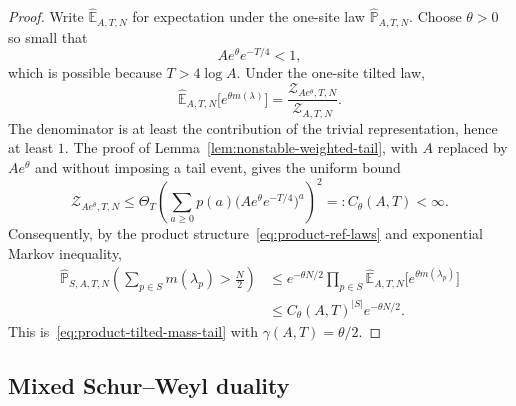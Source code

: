 \documentclass[11pt,a4paper,reqno]{amsart}
\theoremstyle{definition}
\theoremstyle{remark}
\newcommand\E{{\mathbb E}}
\newcommand\Pbb{{\mathbb{P}}}
\begin{document}
\begin{proof}
Write $\widehat\E_{A,T,N}$ for expectation under the one-site law $\widehat\Pbb_{A,T,N}$. Choose $\theta>0$ so small that
\[
Ae^{\theta}e^{-T/4}<1,
\]
which is possible because $T>4\log A$. Under the one-site tilted law,
\[
\widehat\E_{A,T,N}\bigl[e^{\theta m(\lambda)}\bigr]
=\frac{\mathcal Z_{Ae^{\theta},T,N}}{\mathcal Z_{A,T,N}}.
\]
The denominator is at least the contribution of the trivial representation, hence at least $1$. The proof of Lemma~\ref{lem:nonstable-weighted-tail}, with $A$ replaced by $Ae^{\theta}$ and without imposing a tail event, gives the uniform bound
\[
\mathcal Z_{Ae^{\theta},T,N}
\le \Theta_T\left(\sum_{a\ge0}p(a)\bigl(Ae^{\theta}e^{-T/4}\bigr)^a\right)^2
=:C_\theta(A,T)<\infty.
\]
Consequently, by the product structure~\eqref{eq:product-ref-laws} and exponential Markov inequality,
\begin{align*}
\widehat\Pbb_{S,A,T,N}\left(\sum_{p\in S}m(\lambda_p)>\frac N2\right)
&\le e^{-\theta N/2}
\prod_{p\in S}\widehat\E_{A,T,N}\bigl[e^{\theta m(\lambda_p)}\bigr]\\
&\le C_\theta(A,T)^{|S|}e^{-\theta N/2}.
\end{align*}
This is~\eqref{eq:product-tilted-mass-tail} with $\gamma(A,T)=\theta/2$.
\end{proof}

\subsection{Mixed Schur--Weyl duality}
\label{subsec:mixed-schur-weyl}
\end{document}
